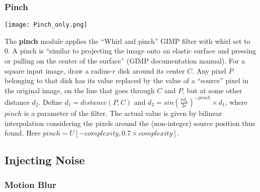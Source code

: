 \documentclass{article} %
\begin{document}
\vspace*{4mm}

\subsubsection*{Pinch}

\begin{minipage}[b]{0.14\linewidth}
\begin{center}
\texttt{[image: Pinch\_only.png]}\\
\vspace*{15mm}
\end{center}
\end{minipage}%
\hspace{0.3cm}\begin{minipage}[b]{0.86\linewidth}
The {\bf pinch} module applies the ``Whirl and pinch'' GIMP filter with whirl set to 0. 
A pinch is ``similar to projecting the image onto an elastic
surface and pressing or pulling on the center of the surface'' (GIMP documentation manual).
For a square input image, draw a radius-$r$ disk
around its center $C$. Any pixel $P$ belonging to
that disk has its value replaced by
the value of a ``source'' pixel in the original image,
on the line that goes through $C$ and $P$, but
at some other distance $d_2$. Define $d_1=distance(P,C)$
and $d_2 = sin(\frac{\pi{}d_1}{2r})^{-pinch} \times
d_1$, where $pinch$ is a parameter of the filter.
The actual value is given by bilinear interpolation considering the pixels
around the (non-integer) source position thus found.
Here $pinch \sim U[-complexity, 0.7 \times complexity]$.
\end{minipage}


\subsection{Injecting Noise}

\subsubsection*{Motion Blur}
\end{document}
